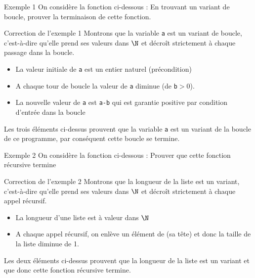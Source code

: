 \documentclass[10pt]{beamer}
\begin{document}
\begin{frame}[fragile]{\Ctitle}{\stitle}
	\begin{exampleblock}{Exemple 1}
		On considère la fonction ci-dessous :
		\onslide<2-> En trouvant un variant de boucle, prouver la terminaison de cette fonction.
	\end{exampleblock}
\end{frame}

\begin{frame}[fragile]{\Ctitle}{\stitle}
	\begin{exampleblock}{Correction de l'exemple 1}
		\textcolor{OliveGreen}{Montrons que la variable {\tt a} est un variant de boucle, c'est-à-dire qu'elle prend ses valeurs dans $\N$ et  décroît strictement à chaque passage dans la boucle.}
		\begin{itemize}
			\item<2->{\textcolor{OliveGreen}{La valeur initiale de \texttt{a} est un entier naturel (précondition)}}
			\item<3->{\textcolor{OliveGreen}{A chaque tour de boucle la valeur de \texttt{a} diminue (de \texttt{b}$>0$).}}
			\item<4->{\textcolor{OliveGreen}{La nouvelle valeur de \texttt{a} est \texttt{a-b} qui est garantie positive par condition d'entrée dans la boucle}}
		\end{itemize}
		\textcolor{OliveGreen}{Les trois éléments ci-dessus prouvent que la variable {\tt a} est un variant de la boucle  de ce programme, par conséquent cette boucle se termine.}
	\end{exampleblock}
\end{frame}

\begin{frame}[fragile]{\Ctitle}{\stitle}
	\begin{exampleblock}{Exemple 2}
		On considère la fonction ci-dessous :
		\onslide<2-> Prouver que cette fonction récursive termine
	\end{exampleblock}
\end{frame}

\begin{frame}[fragile]{\Ctitle}{\stitle}
	\begin{exampleblock}{Correction de l'exemple 2}
		\textcolor{OliveGreen}{Montrons que la longueur de la liste  est un variant, c'est-à-dire qu'elle prend ses valeurs dans $\N$ et  décroît strictement à chaque appel récursif.}
		\begin{itemize}
			\item<2->{\textcolor{OliveGreen}{La longueur d'une liste est à valeur dans $\N$}}
			\item<3->{\textcolor{OliveGreen}{A chaque appel récursif, on enlève un élément de  (sa tête) et donc la taille de la liste diminue de 1.}}
		\end{itemize}
		\textcolor{OliveGreen}{Les deux éléments ci-dessus prouvent que la longueur de la liste est un variant et que donc cette fonction récursive termine.}
	\end{exampleblock}
\end{frame}
\end{document}
